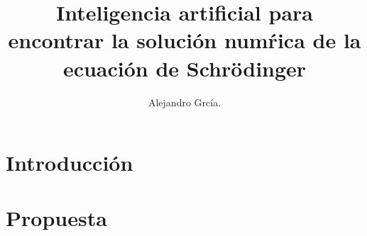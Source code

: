 \documentclass[]{rmf-d}
\begin{document}
	\title{Inteligencia artificial para encontrar la soluci\'on num\'rica de la ecuaci\'on de Schr\"odinger
	\vspace{-6pt}}

	\author{Alejandro Grcía.}
	\address{TNM\\
		TESOEM}


	\maketitle {} %


	\begin{resumen}
		
	\end{resumen}
	\begin{abstract}
		
	\end{abstract}
	 
	\begin{multicols}{2}
		\section{Introducci\'on}
			
		\section{Propuesta}
			
	\end{multicols}
	\medline
	\begin{multicols}{2}
		\begin{thebibliography}{99}
		\end{thebibliography}
	\end{multicols}
\end{document}
